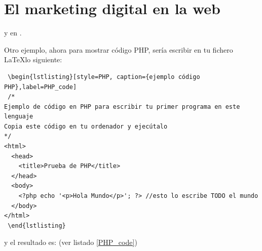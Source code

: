 \section{El marketing digital en la web}

 \cite{listing_packagge} y en \cite{heinz1listings}.

Otro ejemplo, ahora para mostrar código PHP, sería escribir en tu fichero \LaTeX lo siguiente:
\begin{verbatim}
 \begin{lstlisting}[style=PHP, caption={ejemplo código PHP},label=PHP_code]
 /* 
Ejemplo de código en PHP para escribir tu primer programa en este lenguaje
Copia este código en tu ordenador y ejecútalo
*/
<html>
  <head>
    <title>Prueba de PHP</title>
  </head>
  <body>
    <?php echo '<p>Hola Mundo</p>'; ?> //esto lo escribe TODO el mundo
  </body>
</html>
 \end{lstlisting}
\end{verbatim}
 
 y el resultado es: (ver listado \ref{PHP_code})
 